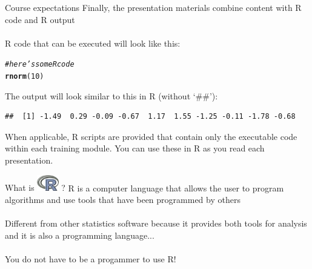 \documentclass[xcolor=svgnames]{beamer}\usepackage[]{graphicx}\usepackage[]{color}
\makeatletter
\newcommand{\hlnum}[1]{\textcolor[rgb]{0.686,0.059,0.569}{#1}}%
\newcommand{\hlcom}[1]{\textcolor[rgb]{0.678,0.584,0.686}{\textit{#1}}}%
\newcommand{\hlstd}[1]{\textcolor[rgb]{0.345,0.345,0.345}{#1}}%
\newcommand{\hlkwd}[1]{\textcolor[rgb]{0.737,0.353,0.396}{\textbf{#1}}}%
\newenvironment{kframe}{%
 \def\at@end@of@kframe{}%
 \ifinner\ifhmode%
  \def\at@end@of@kframe{\end{minipage}}%
  \begin{minipage}{\columnwidth}%
 \fi\fi%
 \def\FrameCommand##1{\hskip\@totalleftmargin \hskip-\fboxsep
 \colorbox{shadecolor}{##1}\hskip-\fboxsep
     \hskip-\linewidth \hskip-\@totalleftmargin \hskip\columnwidth}%
 \MakeFramed {\advance\hsize-\width
   \@totalleftmargin\z@ \linewidth\hsize
   \@setminipage}}%
 {\par\unskip\endMakeFramed%
 \at@end@of@kframe}
\newenvironment{knitrout}{}{} %
\makeatother
\begin{document}
\begin{frame}[containsverbatim]{Course expectations}
Finally, the presentation materials combine content with R code and R output\\~\\
R code that can be executed will look like this:
\begin{knitrout}\scriptsize
{}\color{fgcolor}\begin{kframe}
\begin{alltt}
\hlcom{# here's some R code}
\hlkwd{rnorm}\hlstd{(}\hlnum{10}\hlstd{)}
\end{alltt}
\end{kframe}
\end{knitrout}
The output will look similar to this in R (without `\#\#'):
\begin{knitrout}\scriptsize
{}\color{fgcolor}\begin{kframe}
\begin{verbatim}
##  [1] -1.49  0.29 -0.09 -0.67  1.17  1.55 -1.25 -0.11 -1.78 -0.68
\end{verbatim}
\end{kframe}
\end{knitrout}
When applicable, R scripts are provided that contain only the executable code within each training module.  You can use these in R as you read each presentation.
\end{frame}

\begin{frame}{What is \includegraphics[width=0.07\textwidth]{Rlogo.jpg} \hspace{0.2em}? }
R is a computer language that allows the user to program algorithms and use tools that have been programmed by others\\~\\
Different from other statistics software because it provides both tools for analysis and it is also a programming language...\\~\\
You do not have to be a progammer to use R!
\end{frame}
\end{document}
